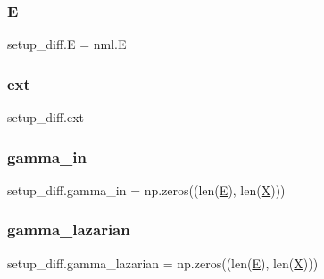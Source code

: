 \mbox{\label{namespacesetup__diff_aa5cb1501a25fe4b39a92f30f468e71e8}} 
\subsubsection{\texorpdfstring{E}{E}}
{\footnotesize\ttfamily setup\+\_\+diff.\+E = nml.\+E}

\mbox{\label{namespacesetup__diff_a68f10ace87e537cf2df9227f8bd6f403}} 
\subsubsection{\texorpdfstring{ext}{ext}}
{\footnotesize\ttfamily setup\+\_\+diff.\+ext}

\mbox{\label{namespacesetup__diff_a655b67b4520700415a6a789133ae2555}} 
\subsubsection{\texorpdfstring{gamma\+\_\+in}{gamma\_in}}
{\footnotesize\ttfamily setup\+\_\+diff.\+gamma\+\_\+in = np.\+zeros((len(\hyperlink{namespacesetup__diff_aa5cb1501a25fe4b39a92f30f468e71e8}{E}), len(\hyperlink{namespacesetup__diff_ad01f7c1ee607d8a67926e30be25385f1}{X})))}

\mbox{\label{namespacesetup__diff_a8ca2040e5b5bc0c4f1e3ec6d790b9d99}} 
\subsubsection{\texorpdfstring{gamma\+\_\+lazarian}{gamma\_lazarian}}
{\footnotesize\ttfamily setup\+\_\+diff.\+gamma\+\_\+lazarian = np.\+zeros((len(\hyperlink{namespacesetup__diff_aa5cb1501a25fe4b39a92f30f468e71e8}{E}), len(\hyperlink{namespacesetup__diff_ad01f7c1ee607d8a67926e30be25385f1}{X})))}

